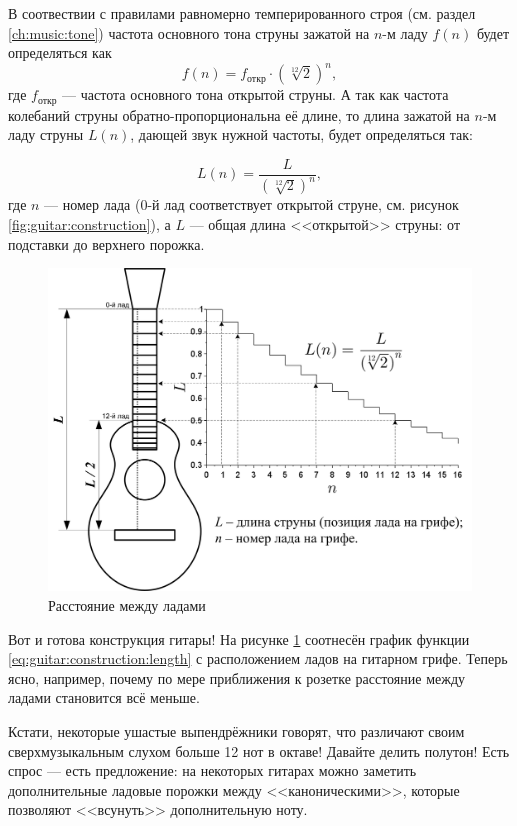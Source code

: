 В соотвествии с правилами равномерно темперированного строя (см. раздел \eqref{ch:music:tone}) частота основного тона струны зажатой на $n$-м ладу $f(n)$ будет определяться как 
\[
    f(n) = f_\text{откр}\cdot(\sqrt[12]{2})^n,
\] 
где $f_\text{откр}$ --- частота основного тона открытой струны. А так как частота колебаний струны обратно-пропорциональна её длине, то длина зажатой на $n$-м ладу струны $L(n)$, дающей звук нужной частоты, будет определяться так:

\begin{equation}
    \label{eq:guitar:construction:length}
    L(n) = \frac{L}{(\sqrt[12]{2})^n},
\end{equation}
где $n$ --- номер лада ($0$-й лад соответствует открытой струне, см. рисунок \ref{fig:guitar:construction}), а $L$ --- общая длина <<открытой>> струны: от подставки до верхнего порожка.

\begin{figure}[!ht]
    \centering
    \includegraphics{fig/string-length.png}
    \caption{Расстояние между ладами}\label{fig:guitar:construction:length}
\end{figure} 

Вот и готова конструкция гитары! На рисунке \ref{fig:guitar:construction:length} соотнесён график функции \ref{eq:guitar:construction:length} с расположением ладов на гитарном грифе. Теперь ясно, например, почему по мере приближения к розетке расстояние между ладами становится всё меньше.

Кстати, некоторые ушастые выпендрёжники говорят, что различают своим сверхмузыкальным слухом больше 12 нот в октаве! Давайте делить полутон! Есть спрос --- есть предложение: на некоторых гитарах можно заметить дополнительные ладовые порожки между <<каноническими>>, которые позволяют <<всунуть>> дополнительную ноту.

